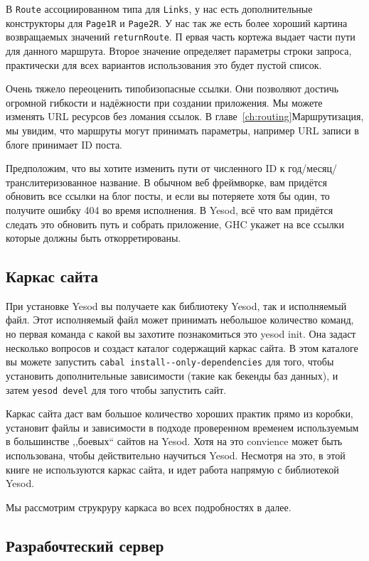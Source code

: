 В \lstinline'Route' ассоциированном типа для \lstinline'Links', у нас есть 
дополнительные конструкторы для \lstinline'Page1R' и \lstinline'Page2R'.
У нас так же есть более хороший картина возвращаемых значений \lstinline'returnRoute'. П
ервая часть кортежа выдает части пути для данного маршрута. Второе значение определяет
параметры строки запроса, практически для всех вариантов использования это будет пустой список.

Очень тяжело переоценить типобизопасные ссылки. Они позволяют достичь огромной гибкости и надёжности 
при создании приложения. Мы можете изменять URL ресурсов без ломания ссылок. 
В главе~\ref{ch:routing}Маршрутизация, мы увидим, что маршруты могут принимать параметры, 
например URL записи в блоге принимает ID поста.

Предположим, что вы хотите изменить пути от численного ID к год/месяц/транслитеризованное название. В обычном 
веб фреймворке, вам придётся обновить все ссылки на блог посты, и если вы потеряете хотя бы один, то 
получите ошибку 404 во время исполнения. В Yesod, всё что вам придётся следать это обновить 
путь и собрать приложение, GHC укажет на все ссылки которые должны быть откорретированы.

\subsection{Каркас сайта}

При установке Yesod вы получаете как библиотеку Yesod, так и исполняемый файл. Этот исполняемый файл
может принимать небольшое количество команд, но первая команда с какой вы захотите познакомиться это
yesod init. Она задаст несколько вопросов и создаст каталог содержащий каркас сайта. В этом каталоге
вы можете запустить \lstinline'cabal install--only-dependencies' для того, чтобы установить дополнительные
зависимости (такие как бекенды баз данных), и затем \lstinline'yesod devel' для того чтобы запустить сайт.

Каркас сайта даст вам большое количество хороших практик прямо из коробки, установит файлы и
зависимости в подходе проверенном временем используемым в большинстве ,,боевых`` сайтов на Yesod.
Хотя на это convience может быть использована, чтобы действительно научиться Yesod. 
Несмотря на это, в этой книге не используются каркас сайта, и идет работа напрямую с 
библиотекой Yesod.

Мы рассмотрим струкруру каркаса во всех подробностях в далее.

\subsection{Разрабочтеский сервер}

